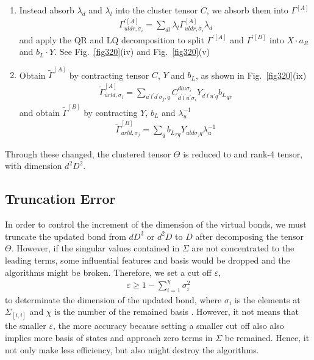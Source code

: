\begin{enumerate}
	\item Instead absorb $\lambda_d$ and $\lambda_l$ into the cluster tensor $C$, we absorb them into $\Gamma^{[A]}$
		\begin{align}
			\Gamma^{\prime [A]}_{uldr,\sigma_i} = \sum_{dl}{\lambda_l \Gamma^{[A]}_{uldr,\sigma_i} \lambda_d}
		\end{align}
		and apply the QR and LQ decomposition to split $\Gamma^{\prime [A]}$ and $\Gamma^{\prime [B]}$ into $X\cdot a_R$ and $b_L \cdot Y$. See Fig.~\ref{fig320}(iv) and Fig.~\ref{fig320}(v) 
	\item Obtain $\widetilde{\Gamma}^{[A]}$ by contracting tensor $C$, $Y$ and $b_L$, as shown in Fig.~\ref{fig320}(ix)
		\begin{align}
			\widetilde{\Gamma}^{[A]}_{urld, \sigma_i} = \sum_{u^{\prime}l^{\prime}d^{\prime}\sigma_j,q}{C^{dlu\sigma_i}_{d^{\prime}l^{\prime}u^{\prime}\sigma_i}Y_{d^{\prime}l^{\prime}u^{\prime}q}{b_L}_{qr}}
		\end{align}
		and obtain $\widetilde{\Gamma}^{[B]}$ by contracting $Y$, $b_L$ and $\lambda_u^{-1}$
		\begin{align}
			\widetilde{\Gamma}^{[B]}_{urld,\sigma_j} = \sum_{q}{{b_L}_{rq}Y_{uld\sigma_j q}\lambda_u^{-1}}
		\end{align}
\end{enumerate}

Through these changed, the clustered tensor $\Theta$ is reduced to and rank-4 tensor, with dimension $d^2D^2$.

\subsection{Truncation Error}
In order to control the increment of the dimension of the virtual bonds, we must truncate the updated bond from $dD^3$ or $d^2D$ to $D$ after decomposing the tensor $\Theta$. However, if the singular values contained in $\Sigma$ are not concentrated to the leading terms, some influential features and basis would be dropped and the algorithms might be broken. Therefore, we set a cut off $\varepsilon$, 
\begin{align}
	\varepsilon \geq 1 - \sum_{i=1}^{\chi}{\sigma_i^2}
\end{align}
to determinate the dimension of the updated bond, where $\sigma_i$ is the elements at $\Sigma_{[i,i]}$ and $\chi$ is the number of the remained basis . However, it not means that the smaller $\varepsilon$, the more accuracy because setting a smaller cut off also also implies more basis of states and approach zero terms in $\Sigma$ be remained. Hence, it not only make less efficiency, but also might destroy the algorithms.

